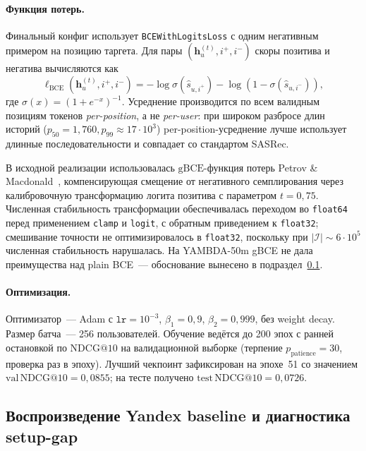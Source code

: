 \paragraph{Функция потерь.} Финальный конфиг использует \texttt{BCEWithLogitsLoss} с одним негативным примером на позицию таргета. Для пары $(\mathbf{h}_u^{(t)}, i^+, i^-)$ скоры позитива и негатива вычисляются как
\begin{equation*}
    \ell_{\mathrm{BCE}}(\mathbf{h}_u^{(t)}, i^+, i^-) = -\log \sigma\!\left(\hat{s}_{u, i^+}\right) - \log\!\left(1 - \sigma\!\left(\hat{s}_{u, i^-}\right)\right),
\end{equation*}
где $\sigma(x) = (1 + e^{-x})^{-1}$. Усреднение производится по всем валидным позициям токенов \emph{per-position}, а не \emph{per-user}: при широком разбросе длин историй ($p_{50}=1{,}760, p_{99} \approx 17 \cdot 10^3$) per-position-усреднение лучше использует длинные последовательности и совпадает со стандартом SASRec.

В исходной реализации использовалась $\mathrm{gBCE}$-функция потерь Petrov \& Macdonald~\cite{gsasrec2023}, компенсирующая смещение от негативного семплирования через калибровочную трансформацию логита позитива с параметром $t = 0{,}75$. Численная стабильность трансформации обеспечивалась переходом во \texttt{float64} перед применением \texttt{clamp} и \texttt{logit}, с обратным приведением к \texttt{float32}; смешивание точности не оптимизировалось в \texttt{float32}, поскольку при $|\mathcal{I}| \sim 6 \cdot 10^5$ численная стабильность нарушалась. На YAMBDA-50m gBCE не дала преимущества над plain BCE~--- обоснование вынесено в подраздел~\ref{subsec:ch3:setup-gap}.

\paragraph{Оптимизация.} Оптимизатор~--- Adam с $\mathtt{lr} = 10^{-3}$, $\beta_1 = 0{,}9$, $\beta_2 = 0{,}999$, без weight decay. Размер батча~--- 256 пользователей. Обучение ведётся до 200 эпох с ранней остановкой по $\mathrm{NDCG@10}$ на валидационной выборке (терпение $p_{\mathrm{patience}} = 30$, проверка раз в эпоху). Лучший чекпоинт зафиксирован на эпохе~51 со значением $\mathrm{val\,NDCG@10} = 0{,}0855$; на тесте получено $\mathrm{test\,NDCG@10} = 0{,}0726$.

\subsection{Воспроизведение Yandex baseline и диагностика setup-gap}\label{subsec:ch3:setup-gap}

